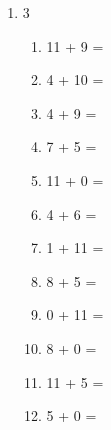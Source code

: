 \documentclass{tufte-book}
\begin{document}
\begin{enumerate}
  \item
  \begin{multicols}{3}

    \begin{enumerate}\bigskip
      \item 11 + 9 = \dotfill\bigskip
      \item 4 + 10 = \dotfill\bigskip
      \item 4 + 9 = \dotfill\bigskip
      \item 7 + 5 = \dotfill
      \item 11 + 0 = \dotfill\bigskip
      \item 4 + 6 = \dotfill\bigskip
      \item 1 + 11 = \dotfill\bigskip
      \item 8 + 5 = \dotfill
      \item 0 + 11 = \dotfill\bigskip
      \item 8 + 0 = \dotfill\bigskip
      \item 11 + 5 = \dotfill\bigskip
      \item 5 + 0 = \dotfill
    \end{enumerate}
\end{multicols}


\end{enumerate}
\end{document}
